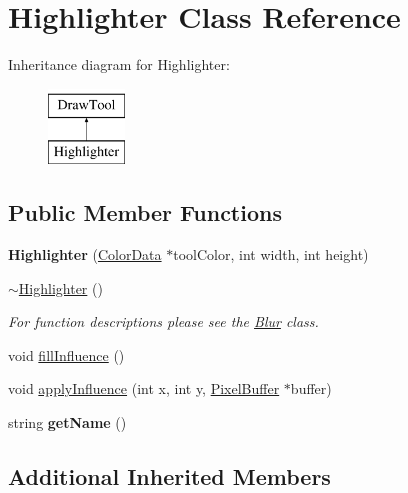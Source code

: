 \hypertarget{classHighlighter}{\section{Highlighter Class Reference}
\label{classHighlighter}
}
Inheritance diagram for Highlighter\-:\begin{figure}[H]
\begin{center}
\leavevmode
\includegraphics[height=2.000000cm]{classHighlighter}
\end{center}
\end{figure}
\subsection*{Public Member Functions}
\begin{DoxyCompactItemize}
\item 
\hypertarget{classHighlighter_aec9c28167c01f98e3da6eb38e64e6c67}{{\bfseries Highlighter} (\hyperlink{classColorData}{Color\-Data} $\ast$tool\-Color, int width, int height)}\label{classHighlighter_aec9c28167c01f98e3da6eb38e64e6c67}

\item 
\hyperlink{classHighlighter_a3c339de18ac3c2334b69480baee54dd5}{$\sim$\-Highlighter} ()
\begin{DoxyCompactList}\small\item\em For function descriptions please see the \hyperlink{classBlur}{Blur} class. \end{DoxyCompactList}\item 
void \hyperlink{classHighlighter_ab2d858cc3fbddace3f64688293cad8e1}{fill\-Influence} ()
\item 
void \hyperlink{classHighlighter_a28e750d99d9aa85521427001ef73be0d}{apply\-Influence} (int x, int y, \hyperlink{classPixelBuffer}{Pixel\-Buffer} $\ast$buffer)
\item 
\hypertarget{classHighlighter_aab9bc271db3cc23737e7604a9ab29211}{string {\bfseries get\-Name} ()}\label{classHighlighter_aab9bc271db3cc23737e7604a9ab29211}

\end{DoxyCompactItemize}
\subsection*{Additional Inherited Members}


